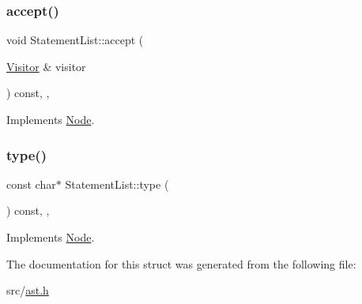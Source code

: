 \subsubsection{\texorpdfstring{accept()}{accept()}}
{\footnotesize\ttfamily void Statement\+List\+::accept (\begin{DoxyParamCaption}\item[{\hyperlink{struct_visitor}{Visitor} \&}]{visitor }\end{DoxyParamCaption}) const\hspace{0.3cm}{\ttfamily [inline]}, {\ttfamily [override]}, {\ttfamily [virtual]}}



Implements \hyperlink{struct_node_a10bd7af968140bbf5fa461298a969c71}{Node}.

\mbox{\label{struct_statement_list_a720038f01e820f043e7f16e4acc7a0f9}} 
\subsubsection{\texorpdfstring{type()}{type()}}
{\footnotesize\ttfamily const char$\ast$ Statement\+List\+::type (\begin{DoxyParamCaption}{ }\end{DoxyParamCaption}) const\hspace{0.3cm}{\ttfamily [inline]}, {\ttfamily [override]}, {\ttfamily [virtual]}}



Implements \hyperlink{struct_node_a82f29420d0a38efcc370352528e94e9b}{Node}.



The documentation for this struct was generated from the following file\+:\begin{DoxyCompactItemize}
\item 
src/\hyperlink{ast_8h}{ast.\+h}\end{DoxyCompactItemize}
